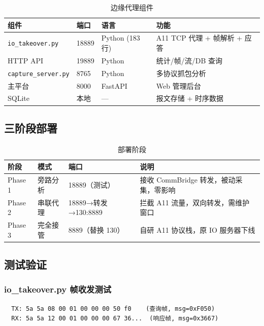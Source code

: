 \documentclass[12pt,a4paper]{ctexart}
\newcommand{\code}[1]{\texttt{\small #1}}
\begin{document}
\begin{table}[H]\centering
\caption{边缘代理组件}
\begin{tabular}{p{3.5cm} p{2cm} p{2.5cm} p{4.5cm}}
\toprule
\textbf{组件} & \textbf{端口} & \textbf{语言} & \textbf{功能} \\
\midrule
\code{io\_takeover.py} & 18889 & Python (183行) & A11 TCP 代理 + 帧解析 + 应答 \\
HTTP API & 19889 & Python & 统计/帧/流/DB 查询 \\
\code{capture\_server.py} & 8765 & Python & 多协议抓包分析 \\
主平台 & 8000 & FastAPI & Web 管理后台 \\
SQLite & 本地 & --- & 报文存储 + 时序数据 \\
\bottomrule
\end{tabular}
\end{table}

\subsection{三阶段部署}

\begin{table}[H]\centering
\caption{部署阶段}
\begin{tabular}{p{1.5cm} p{2.5cm} p{3.5cm} p{5cm}}
\toprule
\textbf{阶段} & \textbf{模式} & \textbf{端口} & \textbf{说明} \\
\midrule
Phase 1 & 旁路分析 & 18889（测试） & 接收 CommBridge 转发，被动采集，零影响 \\
Phase 2 & 串联代理 & 18889→转发→130:8889 & 拦截 A11 流量，双向转发，需维护窗口 \\
Phase 3 & 完全接管 & 8889（替换 130） & 自研 A11 协议栈，原 IO 服务器下线 \\
\bottomrule
\end{tabular}
\end{table}

\subsection{测试验证}

\subsubsection{io\_takeover.py 帧收发测试}

\begin{verbatim}
  TX: 5a 5a 08 00 01 00 00 00 50 f0    (查询帧, msg=0xF050)
  RX: 5a 5a 12 00 01 00 00 00 67 36...  (响应帧, msg=0x3667)
\end{verbatim}
\end{document}
